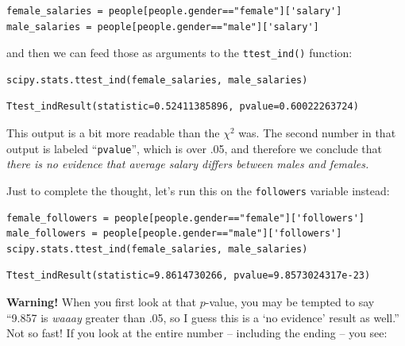 \begin{Verbatim}[fontsize=\footnotesize,samepage=true,frame=single,framesep=3mm]
female_salaries = people[people.gender=="female"]['salary']
male_salaries = people[people.gender=="male"]['salary']
\end{Verbatim}
\vspace{-.2in}



and then we can feed those as arguments to the \texttt{ttest\_ind()} function:

\begin{Verbatim}[fontsize=\small,samepage=true,frame=single,framesep=3mm]
scipy.stats.ttest_ind(female_salaries, male_salaries)
\end{Verbatim}
\vspace{-.2in}

\begin{Verbatim}[fontsize=\footnotesize,samepage=true,frame=leftline,framesep=5mm,framerule=1mm]
Ttest_indResult(statistic=0.52411385896, pvalue=0.60022263724)
\end{Verbatim}

This output is a bit more readable than the $\chi^2$ was. The second number in
that output is labeled ``\texttt{pvalue}'', which is over .05, and therefore we
conclude that \textit{there is no evidence that average salary differs between
males and females.}

Just to complete the thought, let's run this on the \texttt{followers} variable
instead:

\begin{Verbatim}[fontsize=\footnotesize,samepage=true,frame=single,framesep=3mm]
female_followers = people[people.gender=="female"]['followers']
male_followers = people[people.gender=="male"]['followers']
scipy.stats.ttest_ind(female_salaries, male_salaries)
\end{Verbatim}
\vspace{-.2in}

\begin{Verbatim}[fontsize=\footnotesize,samepage=true,frame=leftline,framesep=5mm,framerule=1mm]
Ttest_indResult(statistic=9.8614730266, pvalue=9.8573024317e-23)
\end{Verbatim}

\textbf{Warning!} When you first look at that $p$-value, you may be tempted to
say ``9.857 is \textit{waaay} greater than .05, so I guess this is a `no
evidence' result as well.'' Not so fast! If you look at the entire number --
including the ending -- you see:

